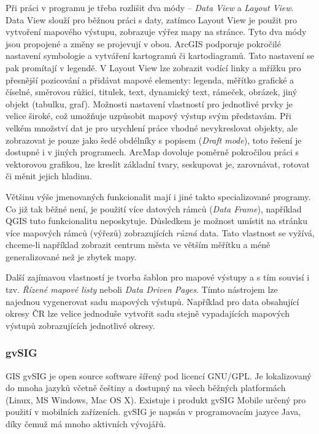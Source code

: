 \documentclass[a4paper,12pt,draft]{article}
\begin{document}
Při práci v programu je třeba rozlišit dva módy -- \emph{Data View}
a \emph{Layout View}. Data View slouží pro běžnou práci s daty,
zatímco Layout View je použit pro vytvoření mapového výstupu,
zobrazuje výřez mapy na stránce. Tyto dva módy jsou propojené a
změny se projevují v obou. ArcGIS podporuje pokročilé nastavení
symbologie a vytváření kartogramů či kartodiagramů. Tato nastavení se
pak promítají v legendě. V Layout View lze zobrazit vodící linky a
mřížku pro přesnější pozicování  a  přidávat mapové elementy:
legenda, měřítko grafické a číselné, směrovou růžici, titulek,
text, dynamický text, rámeček, obrázek, jiný objekt (tabulku, graf).
Možnosti nastavení vlastností pro jednotlivé prvky je velice široké,
což umožňuje uzpůsobit mapový výstup svým představám. Při velkém
množství dat je pro urychlení práce vhodné nevykreslovat objekty, ale
zobrazovat je pouze jako šedé obdélníky s popisem (\emph{Draft mode}),
toto řešení je dostupné i v jiných programech. ArcMap dovoluje poměrně
pokročilou práci s vektorovou grafikou, lze kreslit základní tvary,
seskupovat je, zarovnávat, rotovat či měnit jejich hladinu.

Většinu výše jmenovaných funkcionalit mají i jiné takto
specializované programy. Co již tak běžné není, je použití více
datových rámců (\emph{Data Frame}), například QGIS tuto funkcionalitu
neposkytuje. Důsledkem je možnost umístit na stránku více mapových
rámců (výřezů) zobrazujících \emph{různá} data. Tato vlastnost
se vyžívá, chceme-li například zobrazit centrum města ve větším
měřítku a méně generalizované než je zbytek mapy.

Další zajímavou vlastností je tvorba šablon pro mapové výstupy a
s tím souvisí i tzv. \emph{Řízené mapové listy} neboli \emph{Data
Driven Pages}. Tímto nástrojem lze najednou vygenerovat sadu mapových
výstupů. Například pro data obsahující okresy ČR lze velice jednoduše
vytvořit sadu stejně vypadajících mapových výstupů zobrazujících
jednotlivé okresy.


\subsubsection{gvSIG}
GIS gvSIG je open source software šířený pod licencí GNU/GPL. Je
lokalizovaný do mnoha jazyků včetně češtiny a dostupný na všech
běžných platformách (Linux, MS Windows, Mac OS X). Existuje i produkt gvSIG
Mobile určený pro použití v mobilních zařízeních. gvSIG je napsán
v programovacím jazyce Java, díky čemuž má mnoho aktivních vývojářů.
\end{document}
